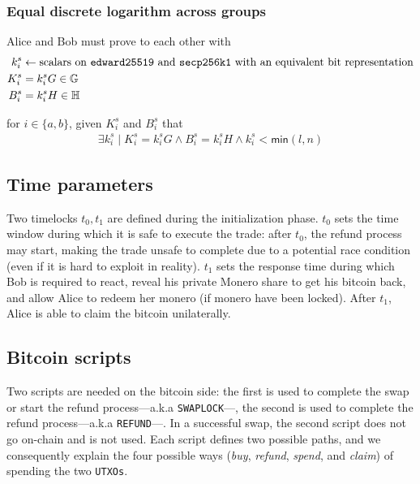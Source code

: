 \documentclass{llncs}
\newcommand{\GG}{\mathbb{G}}
\newcommand{\HH}{\mathbb{H}}
\begin{document}
\subsubsection{Equal discrete logarithm across groups}
Alice and Bob must prove to each other with
\begin{equation}
\begin{split}
    k^s_i &\leftarrow \text{scalars on \texttt{edward25519} and \texttt{secp256k1} with an equivalent bit representation} \\
    K^s_i &= k^s_iG \in \GG \\
    B^s_i &= k^s_iH \in \HH \\
\end{split}
\end{equation}

for $i \in \{a, b\}$, given $K^s_i$ and $B^s_i$ that
\begin{equation}
\begin{split}
    \exists k^s_i \mid K^s_i = k^s_iG \land B^s_i = k^s_iH \land k^s_i < \textsf{min}(l,n)
\end{split}
\end{equation}

\subsection{Time parameters}
Two timelocks $t_0, t_1$ are defined during the initialization phase. $t_0$ sets the time window during which it is safe to execute the trade: after $t_0$, the refund process may start, making the trade unsafe to complete due to a potential race condition (even if it is hard to exploit in reality). $t_1$ sets the response time during which Bob is required to react, reveal his private Monero share to get his bitcoin back, and allow Alice to redeem her monero (if monero have been locked). After $t_1$, Alice is able to claim the bitcoin unilaterally.

\subsection{Bitcoin scripts}
Two scripts are needed on the bitcoin side: the first is used to complete the swap or start the refund process---a.k.a \texttt{SWAPLOCK}---, the second is used to complete the refund process---a.k.a \texttt{REFUND}---. In a successful swap, the second script does not go on-chain and is not used. Each script defines two possible paths, and we consequently explain the four possible ways (\textit{buy}, \textit{refund}, \textit{spend}, and \textit{claim}) of spending the two \texttt{UTXOs}.
\end{document}
